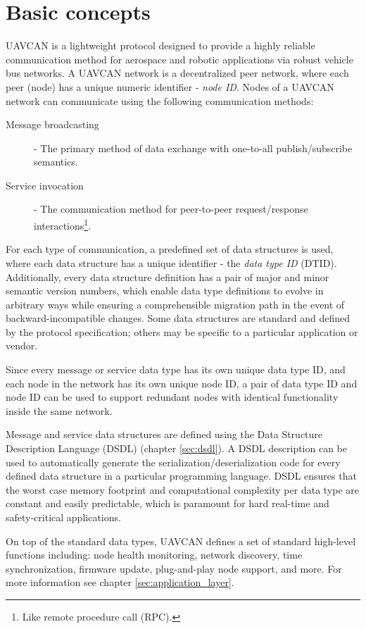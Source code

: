 \chapter{Basic concepts}\label{sec:basic_concepts}

UAVCAN is a lightweight protocol designed to provide a highly reliable communication method for
aerospace and robotic applications via robust vehicle bus networks.
A UAVCAN network is a decentralized peer network, where each peer (node) has a unique
numeric identifier - \emph{node ID}.
Nodes of a UAVCAN network can communicate using the following communication methods:
\begin{description}
    \item[Message broadcasting] - The primary method of data exchange with one-to-all publish/subscribe semantics.
    \item[Service invocation] - The communication method for peer-to-peer request/response
    interactions\footnote{Like remote procedure call (RPC).}.
\end{description}

For each type of communication, a predefined set of data structures is used,
where each data structure has a unique identifier - the \emph{data type ID} (DTID).
Additionally, every data structure definition has a pair of major and minor semantic version numbers,
which enable data type definitions to evolve in arbitrary ways while ensuring a comprehensible
migration path in the event of backward-incompatible changes.
Some data structures are standard and defined by the protocol specification;
others may be specific to a particular application or vendor.

Since every message or service data type has its own unique data type ID,
and each node in the network has its own unique node ID,
a pair of data type ID and node ID can be used to support redundant nodes with identical
functionality inside the same network.

Message and service data structures are defined using the Data Structure Description Language
(DSDL) (chapter \ref{sec:dsdl}).
A DSDL description can be used to automatically generate the serialization/deserialization code
for every defined data structure in a particular programming language.
DSDL ensures that the worst case memory footprint and computational complexity per data type
are constant and easily predictable, which is paramount for hard real-time and safety-critical applications.

On top of the standard data types, UAVCAN defines a set of standard high-level functions including:
node health monitoring, network discovery, time synchronization, firmware update,
plug-and-play node support, and more.
For more information see chapter \ref{sec:application_layer}.

